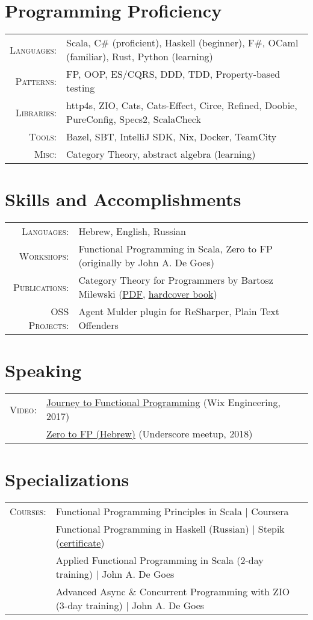 \documentclass[a4paper,11pt]{article}
\begin{document}
\section{Programming Proficiency}
\begin{tabular}{rl}
  \textsc{Languages:}& Scala, C\# (proficient), Haskell (beginner), F\#, OCaml (familiar), Rust, Python (learning)\\
  \textsc{Patterns:}& FP, OOP, ES/CQRS, DDD, TDD, Property-based testing\\
  \textsc{Libraries:}& http4s, ZIO, Cats, Cats-Effect, Circe, Refined, Doobie, PureConfig, Specs2, ScalaCheck\\
  \textsc{Tools:}& Bazel, SBT, IntelliJ SDK, Nix, Docker, TeamCity\\
  \textsc{Misc:}& Category Theory, abstract algebra (learning)
\end{tabular}

\section{Skills and Accomplishments}
\begin{tabular}{rl}
  \textsc{Languages:}& Hebrew, English, Russian\\
  \textsc{Workshops:}& Functional Programming in Scala, Zero to FP (originally by John A. De Goes)\\
  \textsc{Publications:}& Category Theory for Programmers by Bartosz Milewski (\href{https://github.com/hmemcpy/milewski-ctfp-pdf}{PDF}, \href{https://www.blurb.com/b/9621951-category-theory-for-programmers-new-edition-hardco}{hardcover book})\\
  \textsc{OSS Projects:}& Agent Mulder plugin for ReSharper, Plain Text Offenders\\
\end{tabular}

\section{Speaking}
\begin{tabular}{rl}
  \textsc{Video:}&\href{https://www.youtube.com/watch?v=g1EvM4CbUvM}{Journey to Functional Programming} (Wix Engineering, 2017)\\
  &\href{https://www.youtube.com/watch?v=N6ZJwnvTjLA}{Zero to FP (Hebrew)} (Underscore meetup, 2018)\\
\end{tabular}

\section{Specializations}
\begin{tabular}{rl}
  \textsc{Courses:}
  &Functional Programming Principles in Scala | Coursera\\
  &Functional Programming in Haskell (Russian) | Stepik (\href{https://stepik.org/cert/53556}{certificate})\\
  &Applied Functional Programming in Scala (2-day training) | John A. De Goes\\
  &Advanced Async \& Concurrent Programming with ZIO (3-day training) | John A. De Goes
\end{tabular}
\end{document}
